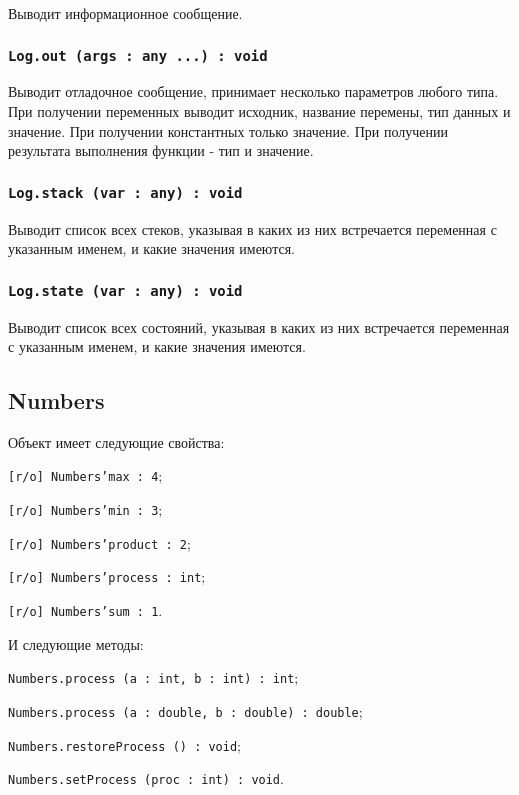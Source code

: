 Выводит информационное сообщение.

\subsubsection{\texttt{Log.out (args : any ...) : void}}

Выводит отладочное сообщение, принимает несколько параметров любого типа. При получении переменных выводит исходник, название перемены, тип данных и значение. При получении константных только значение. При получении результата выполнения функции - тип и значение. 

\subsubsection{\texttt{Log.stack (var : any) : void}}

Выводит список всех стеков, указывая в каких из них встречается переменная с указанным именем, и какие значения имеются.

\subsubsection{\texttt{Log.state (var : any) : void}}

Выводит список всех состояний, указывая в каких из них встречается переменная с указанным именем, и какие значения имеются.

\subsection{{\color{orange} Numbers}}

Объект \numbers{} имеет следующие свойства:
\begin{icItems}
	\item \texttt{[r/o] Numbers'max : 4};
	\item \texttt{[r/o] Numbers'min : 3};
	\item \texttt{[r/o] Numbers'product : 2};
	\item \texttt{[r/o] Numbers'process : int};
	\item \texttt{[r/o] Numbers'sum : 1}.
\end{icItems}

И следующие методы:
\begin{icItems}
	\item \texttt{Numbers.process (a : int, b : int) : int};
	\item \texttt{Numbers.process (a : double, b : double) : double};
	\item \texttt{Numbers.restoreProcess () : void};
	\item \texttt{Numbers.setProcess (proc : int) : void}.
\end{icItems}

